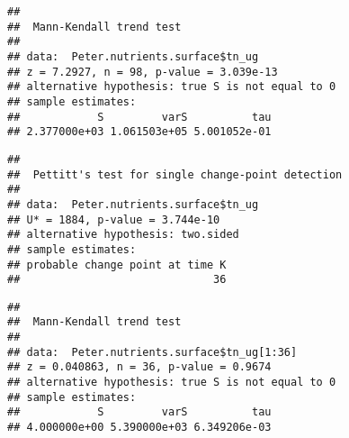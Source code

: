 \documentclass[]{article}
\newenvironment{Shaded}{\begin{snugshade}}{\end{snugshade}}
\newcommand{\KeywordTok}[1]{\textcolor[rgb]{0.13,0.29,0.53}{\textbf{#1}}}
\newcommand{\DecValTok}[1]{\textcolor[rgb]{0.00,0.00,0.81}{#1}}
\newcommand{\CommentTok}[1]{\textcolor[rgb]{0.56,0.35,0.01}{\textit{#1}}}
\newcommand{\OperatorTok}[1]{\textcolor[rgb]{0.81,0.36,0.00}{\textbf{#1}}}
\newcommand{\NormalTok}[1]{#1}
\begin{document}
\begin{verbatim}
## 
##  Mann-Kendall trend test
## 
## data:  Peter.nutrients.surface$tn_ug
## z = 7.2927, n = 98, p-value = 3.039e-13
## alternative hypothesis: true S is not equal to 0
## sample estimates:
##            S         varS          tau 
## 2.377000e+03 1.061503e+05 5.001052e-01
\end{verbatim}

\begin{Shaded}
\end{Shaded}

\begin{verbatim}
## 
##  Pettitt's test for single change-point detection
## 
## data:  Peter.nutrients.surface$tn_ug
## U* = 1884, p-value = 3.744e-10
## alternative hypothesis: two.sided
## sample estimates:
## probable change point at time K 
##                              36
\end{verbatim}

\begin{Shaded}
\end{Shaded}

\begin{verbatim}
## 
##  Mann-Kendall trend test
## 
## data:  Peter.nutrients.surface$tn_ug[1:36]
## z = 0.040863, n = 36, p-value = 0.9674
## alternative hypothesis: true S is not equal to 0
## sample estimates:
##            S         varS          tau 
## 4.000000e+00 5.390000e+03 6.349206e-03
\end{verbatim}

\begin{Shaded}
\end{Shaded}
\end{document}
